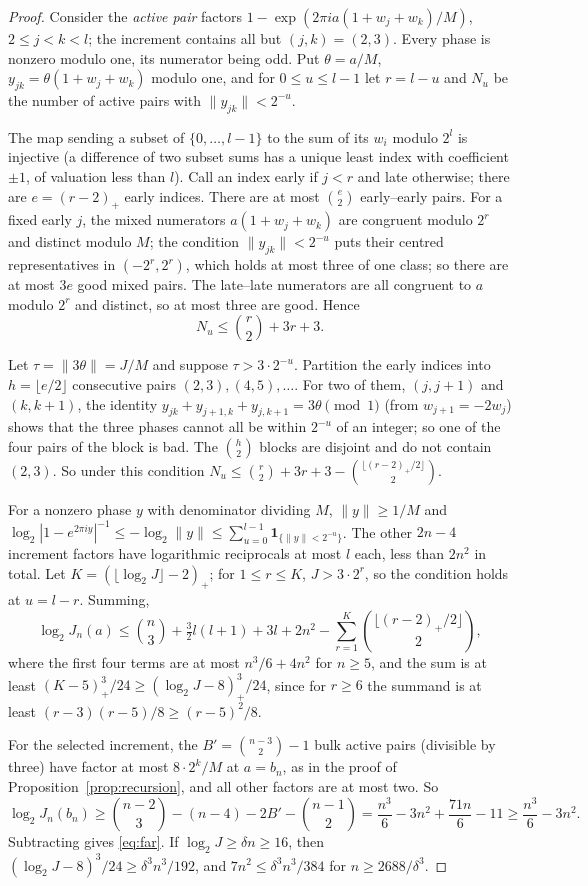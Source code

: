 \begin{proof}
Consider the \emph{active pair} factors $1-\exp(2\pi ia(1+w_j+w_k)/M)$,
$2\le j<k<l$; the increment contains all but $(j,k)=(2,3)$. Every phase is
nonzero modulo one, its numerator being odd. Put $\theta=a/M$,
$y_{jk}=\theta(1+w_j+w_k)$ modulo one, and for $0\le u\le l-1$ let $r=l-u$ and
$N_u$ be the number of active pairs with $\|y_{jk}\|<2^{-u}$.

The map sending a subset of $\{0,\dots,l-1\}$ to the sum of its $w_i$ modulo
$2^l$ is injective (a difference of two subset sums has a unique least index
with coefficient $\pm1$, of valuation less than $l$). Call an index early if
$j<r$ and late otherwise; there are $e=(r-2)_+$ early indices. There are at
most $\binom e2$ early--early pairs. For a fixed early $j$, the mixed numerators
$a(1+w_j+w_k)$ are congruent modulo $2^r$ and distinct modulo $M$; the condition
$\|y_{jk}\|<2^{-u}$ puts their centred representatives in $(-2^r,2^r)$, which
holds at most three of one class; so there are at most $3e$ good mixed pairs.
The late--late numerators are all congruent to $a$ modulo $2^r$ and distinct,
so at most three are good. Hence
\begin{equation}\label{eq:Nu}
 N_u\le\binom r2+3r+3 .
\end{equation}

Let $\tau=\|3\theta\|=J/M$ and suppose $\tau>3\cdot2^{-u}$. Partition the early
indices into $h=\lfloor e/2\rfloor$ consecutive pairs $(2,3),(4,5),\dots$. For
two of them, $(j,j+1)$ and $(k,k+1)$, the identity
$y_{jk}+y_{j+1,k}+y_{j,k+1}=3\theta\pmod1$ (from $w_{j+1}=-2w_j$) shows that
the three phases cannot all be within $2^{-u}$ of an integer; so one of the four
pairs of the block is bad. The $\binom h2$ blocks are disjoint and do not
contain $(2,3)$. So under this condition
$N_u\le\binom r2+3r+3-\binom{\lfloor(r-2)_+/2\rfloor}2$.

For a nonzero phase $y$ with denominator dividing $M$, $\|y\|\ge1/M$ and
$\log_2|1-e^{2\pi iy}|^{-1}\le-\log_2\|y\|\le\sum_{u=0}^{l-1}
\mathbf1_{\{\|y\|<2^{-u}\}}$. The other $2n-4$ increment factors have
logarithmic reciprocals at most $l$ each, less than $2n^2$ in total. Let
$K=(\lfloor\log_2J\rfloor-2)_+$; for $1\le r\le K$, $J>3\cdot2^r$, so the
condition holds at $u=l-r$. Summing,
\[
 \log_2J_n(a)\le\binom n3+\tfrac32l(l+1)+3l+2n^2
 -\sum_{r=1}^K\binom{\lfloor(r-2)_+/2\rfloor}2 ,
\]
where the first four terms are at most $n^3/6+4n^2$ for $n\ge5$, and the sum is
at least $(K-5)_+^3/24\ge(\log_2J-8)_+^3/24$, since for $r\ge6$ the summand is
at least $(r-3)(r-5)/8\ge(r-5)^2/8$.

For the selected increment, the $B'=\binom{n-3}2-1$ bulk active pairs
(divisible by three) have factor at most $8\cdot2^k/M$ at $a=b_n$, as in the
proof of Proposition~\ref{prop:recursion}, and all other factors are at most
two. So
\[
 \log_2J_n(b_n)\ge\binom{n-2}3-(n-4)-2B'-\binom{n-1}2
 =\frac{n^3}6-3n^2+\frac{71n}6-11\ge\frac{n^3}6-3n^2 .
\]
Subtracting gives \eqref{eq:far}. If $\log_2J\ge\delta n\ge16$, then
$(\log_2J-8)^3/24\ge\delta^3n^3/192$, and $7n^2\le\delta^3n^3/384$ for
$n\ge2688/\delta^3$.
\end{proof}

